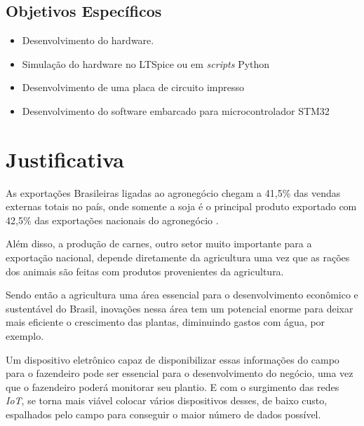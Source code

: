\subsection{Objetivos Específicos}
\begin{itemize}
  \itemsep0em\item Desenvolvimento do hardware.
  \item Simulação do hardware no LTSpice ou em \textit{scripts} Python
  \item Desenvolvimento de uma placa de circuito impresso
  \item Desenvolvimento do software embarcado para microcontrolador STM32

\end{itemize}



\section{Justificativa}

As exportações Brasileiras ligadas ao agronegócio chegam a 41,5\% das vendas
externas totais no país, onde somente a soja é o principal produto exportado com
42,5\% das exportações nacionais do agronegócio \cite{fiesp2018}.

Além disso, a produção de carnes, outro setor muito importante para a exportação
nacional, depende diretamente da agricultura uma vez que as rações dos animais
são feitas com produtos provenientes da agricultura.

Sendo então a agricultura uma área essencial para o desenvolvimento
econômico e sustentável do Brasil, inovações nessa área tem um potencial enorme
para deixar mais eficiente o crescimento das plantas, diminuindo gastos com
água, por exemplo.

Um dispositivo eletrônico capaz de disponibilizar essas informações do campo
para o fazendeiro pode ser essencial para o desenvolvimento do negócio, uma vez
que o fazendeiro poderá monitorar seu plantio. E com o surgimento das redes
\textit{IoT}, se torna mais viável colocar vários dispositivos desses, de baixo custo,
espalhados pelo campo para conseguir o maior número de dados possível.

